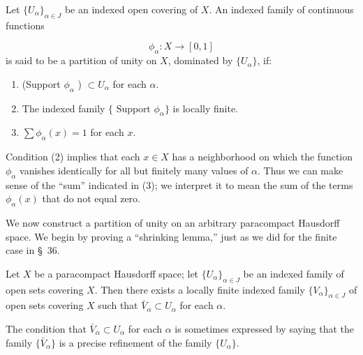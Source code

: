 \begin{definition}
 Let \({\{ U_{\alpha }\} }_{\alpha \in J}\) be an indexed open covering of \(X\). An indexed family of continuous functions

\[
{\phi }_{\alpha } : X \rightarrow [{0,1}]
\]
is said to be a partition of unity on \(X\), dominated by \(\{ U_{\alpha }\}\), if:

\begin{enumerate}[itemsep=0.2em, parsep=0pt, topsep=0pt, partopsep=0pt, leftmargin=*, label=(\arabic*), align=left]
\item (Support \({\phi }_{\alpha }\) ) \(\subset {U}_{\alpha }\) for each \(\alpha\).

\item The indexed family \(\{ {\text{ Support }{\phi }_{\alpha }}\}\) is locally finite.

\item \(\sum {\phi }_{\alpha }(x) = 1\) for each \(x\).
\end{enumerate}
\end{definition}

Condition (2) implies that each \(x \in X\) has a neighborhood on which the function \({\phi }_{\alpha }\) vanishes identically for all but finitely many values of \(\alpha\). Thus we can make sense of the ``sum'' indicated in (3); we interpret it to mean the sum of the terms \({\phi }_{\alpha }(x)\) that do not equal zero.

We now construct a partition of unity on an arbitrary paracompact Hausdorff space. We begin by proving a ``shrinking lemma,'' just as we did for the finite case in \S\ 36.

\begin{lemma}
\label{lem:\thetheorem}
Let \(X\) be a paracompact Hausdorff space; let \({\{ U_{\alpha }\} }_{\alpha \in J}\) be an indexed family of open sets covering \(X\). Then there exists a locally finite indexed family \({\{ V_{\alpha }\} }_{\alpha \in J}\) of open sets covering \(X\) such that \(\bar{V}_{\alpha } \subset {U}_{\alpha }\) for each \(\alpha\).
\end{lemma}

The condition that \(\bar{V}_{\alpha } \subset {U}_{\alpha }\) for each \(\alpha\) is sometimes expressed by saying that the family \(\{ \bar{V}_{\alpha }\}\) is a precise refinement of the family \(\{ U_{\alpha }\}\).

